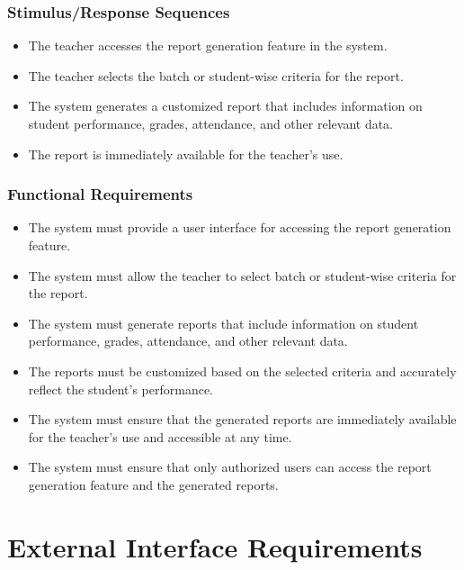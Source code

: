 \documentclass{article}
\begin{document}
\subsubsection{Stimulus/Response Sequences}
\begin{itemize}
  \item The teacher accesses the report generation feature in the system.
  \item The teacher selects the batch or student-wise criteria for the report.
  \item The system generates a customized report that includes information on student performance, grades, attendance, and other relevant data.
  \item The report is immediately available for the teacher's use.
\end{itemize}

\subsubsection{Functional Requirements}
\begin{itemize}
    \item The system must provide a user interface for accessing the report generation feature.
    \item The system must allow the teacher to select batch or student-wise criteria for the report.
    \item The system must generate reports that include information on student performance, grades, attendance, and other relevant data.
    \item The reports must be customized based on the selected criteria and accurately reflect the student's performance.
    \item The system must ensure that the generated reports are immediately available for the teacher's use and accessible at any time.
    \item The system must ensure that only authorized users can access the report generation feature and the generated reports.
\end{itemize}


\section{External Interface Requirements}
\end{document}
